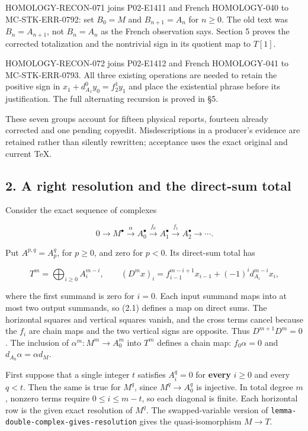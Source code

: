\documentclass[11pt]{article}
\begin{document}
HOMOLOGY-RECON-071 joins P02-E1411 and French HOMOLOGY-040 to MC-STK-ERR-0792: set \(B_0=M\) and \(B_{n+1}=A_n\) for \(n\geq0\). The old text was \(B_n=A_{n+1}\), not \(B_n=A_n\) as the French observation says. Section 5 proves the corrected totalization and the nontrivial sign in its quotient map to \(T[1]\).

HOMOLOGY-RECON-072 joins P02-E1412 and French HOMOLOGY-041 to MC-STK-ERR-0793. All three existing operations are needed to retain the positive sign in \(x_1+d_{A_1}^0y_0=f_2^1y_1\) and place the existential phrase before its justification. The full alternating recursion is proved in §5.

These seven groups account for fifteen physical reports, fourteen already corrected and one pending copyedit. Misdescriptions in a producer's evidence are retained rather than silently rewritten; acceptance uses the exact original and current TeX.

\subsection{2. A right resolution and the direct-sum total}\label{note-08-a-right-resolution-and-the-direct-sum-total}

Consider the exact sequence of complexes

\[
0\longrightarrow M^\bullet\xrightarrow{\alpha}A_0^\bullet
\xrightarrow{f_0}A_1^\bullet\xrightarrow{f_1}A_2^\bullet
\longrightarrow\cdots.
\]

Put \(A^{p,q}=A_p^q\), for \(p\geq0\), and zero for \(p<0\). Its direct-sum total has

\[
T^m=\bigoplus_{i\geq0}A_i^{m-i},\qquad
(D^mx)_i=f_{i-1}^{m-i+1}x_{i-1}+(-1)^i d_{A_i}^{m-i}x_i,       \tag{2.1}
\]

where the first summand is zero for \(i=0\). Each input summand maps into at most two output summands, so (2.1) defines a map on direct sums. The horizontal squares and vertical squares vanish, and the cross terms cancel because the \(f_i\) are chain maps and the two vertical signs are opposite. Thus \(D^{m+1}D^m=0\). The inclusion of \(\alpha^m:M^m\to A_0^m\) into \(T^m\) defines a chain map: \(f_0\alpha=0\) and \(d_{A_0}\alpha=\alpha d_M\).

First suppose that a single integer \(t\) satisfies \(A_i^q=0\) for \textbf{every} \(i\geq0\) and every \(q<t\). Then the same is true for \(M^q\), since \(M^q\to A_0^q\) is injective. In total degree \(m\), nonzero terms require \(0\leq i\leq m-t\), so each diagonal is finite. Each horizontal row is the given exact resolution of \(M^q\). The swapped-variable version of \texttt{lemma-double-complex-gives-resolution} gives the quasi-isomorphism \(M\to T\).
\end{document}
